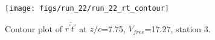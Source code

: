 \begin{figure}[H]
\centering
\texttt{[image: figs/run\_22/run\_22\_rt\_contour]}
\caption{Contour plot of $\overline{r^\prime t^\prime}$ at $z/c$=7.75, $V_{free}$=17.27, station 3.}
\label{fig:run_22_rt_contour}
\end{figure}


